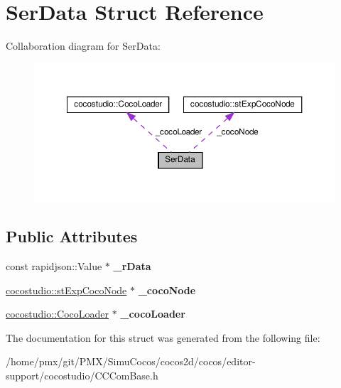 \hypertarget{structSerData}{}\section{Ser\+Data Struct Reference}
\label{structSerData}


Collaboration diagram for Ser\+Data\+:
\nopagebreak
\begin{figure}[H]
\begin{center}
\leavevmode
\includegraphics[width=350pt]{structSerData__coll__graph}
\end{center}
\end{figure}
\subsection*{Public Attributes}
\begin{DoxyCompactItemize}
\item 
\mbox{\label{structSerData_a2f05e837d00816267397753b5d859f10}} 
const rapidjson\+::\+Value $\ast$ {\bfseries \+\_\+r\+Data}
\item 
\mbox{\label{structSerData_ae91c3d213da449758755b47d5fb5426f}} 
\hyperlink{structcocostudio_1_1stExpCocoNode}{cocostudio\+::st\+Exp\+Coco\+Node} $\ast$ {\bfseries \+\_\+coco\+Node}
\item 
\mbox{\label{structSerData_aa31d5f0701beae0185a4ba80b4668423}} 
\hyperlink{classcocostudio_1_1CocoLoader}{cocostudio\+::\+Coco\+Loader} $\ast$ {\bfseries \+\_\+coco\+Loader}
\end{DoxyCompactItemize}


The documentation for this struct was generated from the following file\+:\begin{DoxyCompactItemize}
\item 
/home/pmx/git/\+P\+M\+X/\+Simu\+Cocos/cocos2d/cocos/editor-\/support/cocostudio/C\+C\+Com\+Base.\+h\end{DoxyCompactItemize}
